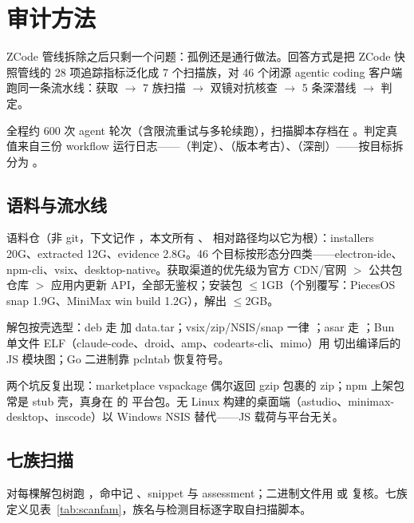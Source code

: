 \chapter{审计方法}
\label{ch:method}

ZCode 管线拆除之后只剩一个问题：孤例还是通行做法。回答方式是把 ZCode 快照管线的 28 项追踪指标泛化成 7 个扫描族，对 46 个闭源 agentic coding 客户端跑同一条流水线：获取 $\to$ 7 族扫描 $\to$ 双镜对抗核查 $\to$ 5 条深潜线 $\to$ 判定。

全程约 600 次 agent 轮次（含限流重试与多轮续跑），扫描脚本存档在 。判定真值来自三份 workflow 运行日志——（判定）、（版本考古）、（深剖）——按目标拆分为 。

\section{语料与流水线}

语料仓（非 git，下文记作 ，本文所有 、 相对路径均以它为根）：installers 20G、extracted 12G、evidence 2.8G。46 个目标按形态分四类——electron-ide、npm-cli、vsix、desktop-native。获取渠道的优先级为官方 CDN/官网 $>$ 公共包仓库 $>$ 应用内更新 API，全部无鉴权；安装包 $\le$1GB（个别覆写：PiecesOS snap 1.9G、MiniMax win build 1.2G），解出 $\le$2GB。

解包按壳选型：deb 走  加 data.tar；vsix/zip/NSIS/snap 一律 ；asar 走 ；Bun 单文件 ELF（claude-code、droid、amp、codearts-cli、mimo）用  切出编译后的 JS 模块图；Go 二进制靠 pclntab 恢复符号。

两个坑反复出现：marketplace vspackage 偶尔返回 gzip 包裹的 zip；npm 上架包常是 stub 壳，真身在  的  平台包。无 Linux 构建的桌面端（astudio、minimax-desktop、inscode）以 Windows NSIS 替代——JS 载荷与平台无关。

\section{七族扫描}

对每棵解包树跑 ，命中记 、snippet 与 assessment；二进制文件用  或  复核。七族定义见表~\ref{tab:scanfam}，族名与检测目标逐字取自扫描脚本。

